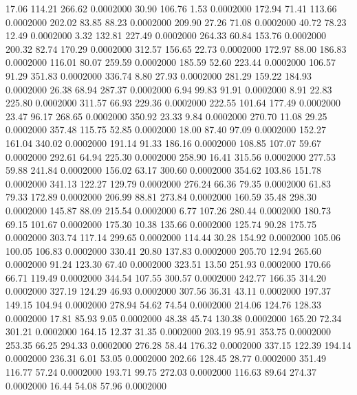   17.06  114.21  266.62   0.0002000
  30.90  106.76    1.53   0.0002000
 172.94   71.41  113.66   0.0002000
 202.02   83.85   88.23   0.0002000
 209.90   27.26   71.08   0.0002000
  40.72   78.23   12.49   0.0002000
   3.32  132.81  227.49   0.0002000
 264.33   60.84  153.76   0.0002000
 200.32   82.74  170.29   0.0002000
 312.57  156.65   22.73   0.0002000
 172.97   88.00  186.83   0.0002000
 116.01   80.07  259.59   0.0002000
 185.59   52.60  223.44   0.0002000
 106.57   91.29  351.83   0.0002000
 336.74    8.80   27.93   0.0002000
 281.29  159.22  184.93   0.0002000
  26.38   68.94  287.37   0.0002000
   6.94   99.83   91.91   0.0002000
   8.91   22.83  225.80   0.0002000
 311.57   66.93  229.36   0.0002000
 222.55  101.64  177.49   0.0002000
  23.47   96.17  268.65   0.0002000
 350.92   23.33    9.84   0.0002000
 270.70   11.08   29.25   0.0002000
 357.48  115.75   52.85   0.0002000
  18.00   87.40   97.09   0.0002000
 152.27  161.04  340.02   0.0002000
 191.14   91.33  186.16   0.0002000
 108.85  107.07   59.67   0.0002000
 292.61   64.94  225.30   0.0002000
 258.90   16.41  315.56   0.0002000
 277.53   59.88  241.84   0.0002000
 156.02   63.17  300.60   0.0002000
 354.62  103.86  151.78   0.0002000
 341.13  122.27  129.79   0.0002000
 276.24   66.36   79.35   0.0002000
  61.83   79.33  172.89   0.0002000
 206.99   88.81  273.84   0.0002000
 160.59   35.48  298.30   0.0002000
 145.87   88.09  215.54   0.0002000
   6.77  107.26  280.44   0.0002000
 180.73   69.15  101.67   0.0002000
 175.30   10.38  135.66   0.0002000
 125.74   90.28  175.75   0.0002000
 303.74  117.14  299.65   0.0002000
 114.44   30.28  154.92   0.0002000
 105.06  100.05  106.83   0.0002000
 330.41   20.80  137.83   0.0002000
 205.70   12.94  265.60   0.0002000
  91.24  123.30   67.40   0.0002000
 323.51   13.50  251.93   0.0002000
 170.66   66.71  119.49   0.0002000
 344.54  107.55  300.57   0.0002000
 242.77  166.35  314.20   0.0002000
 327.19  124.29   46.93   0.0002000
 307.56   36.31   43.11   0.0002000
 197.37  149.15  104.94   0.0002000
 278.94   54.62   74.54   0.0002000
 214.06  124.76  128.33   0.0002000
  17.81   85.93    9.05   0.0002000
  48.38   45.74  130.38   0.0002000
 165.20   72.34  301.21   0.0002000
 164.15   12.37   31.35   0.0002000
 203.19   95.91  353.75   0.0002000
 253.35   66.25  294.33   0.0002000
 276.28   58.44  176.32   0.0002000
 337.15  122.39  194.14   0.0002000
 236.31    6.01   53.05   0.0002000
 202.66  128.45   28.77   0.0002000
 351.49  116.77   57.24   0.0002000
 193.71   99.75  272.03   0.0002000
 116.63   89.64  274.37   0.0002000
  16.44   54.08   57.96   0.0002000
